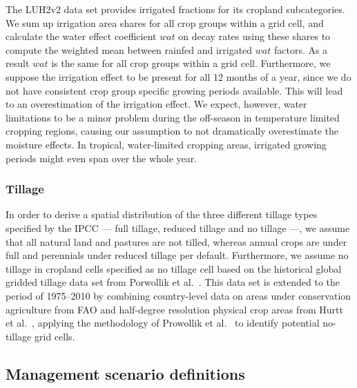 \documentclass[gc, manuscript]{copernicus}
\begin{document}
The LUH2v2 \citep{hurtt_harmonization_2020} data set provides irrigated fractions for its cropland subcategories. We sum up irrigation area shares for all crop groups within a grid cell, and calculate the water effect coefficient \(wat\) on decay rates using these shares to compute the weighted mean between rainfed and irrigated \(wat\) factors. As a result \(wat\) is the same for all crop groups within a grid cell. Furthermore, we suppose the irrigation effect to be present for all 12 months of a year, since we do not have consistent crop group specific growing periods available. This will lead to an overestimation of the irrigation effect. We expect, however, water limitations to be a minor problem during the off-season in temperature limited cropping regions, causing our assumption to not dramatically overestimate the moisture effects. In tropical, water-limited cropping areas, irrigated growing periods might even span over the whole year.

\hypertarget{sec:tillage}{%
\subsubsection{Tillage}\label{sec:tillage}}

In order to derive a spatial distribution of the three different tillage types specified by the IPCC --- full tillage, reduced tillage and no tillage ---, we assume that all natural land and pastures are not tilled, whereas annual crops are under full and perennials under reduced tillage per default. Furthermore, we assume no tillage in cropland cells specified as no tillage cell based on the historical global gridded tillage data set from Porwollik et al.~\citeyearpar{porwollik_generating_2019}. This data set is extended to the period of 1975--2010 by combining country-level data on areas under conservation agriculture from FAO \citeyearpar{fao_aquastat_2016} and half-degree resolution physical crop areas from Hurtt et al.~\citeyearpar{hurtt_harmonization_2020}, applying the methodology of Prowollik et al.~\citeyearpar{porwollik_generating_2019} to identify potential no-tillage grid cells.

\hypertarget{sec:scenarios}{%
\subsection{Management scenario definitions}\label{sec:scenarios}}
\end{document}
